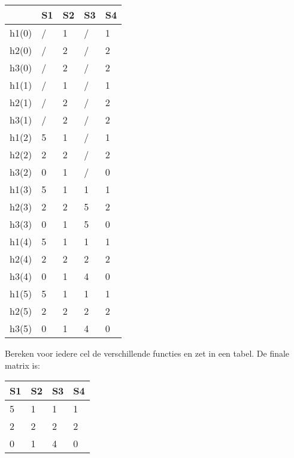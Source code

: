 \documentclass{exam}
\begin{document}
\begin{questions}
\begin{center}
    \begin{tabular}{| l | l | l | l | l |}
    \hline
	 & S1 & S2 & S3 & S4  \\ \hline
     h1(0) & / & 1 & / & 1\\ \hline
     h2(0) & / & 2 & / & 2\\ \hline
     h3(0) & / & 2 & / & 2\\ \hline\hline
     
      h1(1) & / & 1 & / & 1\\ \hline
     h2(1) & / & 2 & / & 2\\ \hline
     h3(1) & / & 2 & / & 2\\ \hline\hline
     
        h1(2) & 5 & 1 & / & 1\\ \hline
     h2(2) & 2 & 2 & / & 2\\ \hline
     h3(2) & 0 & 1 & / & 0\\ \hline\hline
     
      h1(3) & 5 & 1 & 1 & 1\\ \hline
     h2(3) & 2 & 2 & 5 & 2\\ \hline
     h3(3) & 0 & 1 & 5 & 0\\ \hline\hline
     
       h1(4) & 5 & 1 & 1 & 1\\ \hline
     h2(4) & 2 & 2 & 2 & 2\\ \hline
     h3(4) & 0 & 1 & 4 & 0\\ \hline\hline
     
       h1(5) & 5 & 1 & 1 & 1\\ \hline
     h2(5) & 2 & 2 & 2 & 2\\ \hline
     h3(5) & 0 & 1 & 4 & 0\\ \hline
    \end{tabular}
\end{center}

Bereken voor iedere cel de verschillende functies en zet in een tabel.
De finale matrix is: 

\begin{center}
    \begin{tabular}{| l | l | l | l |}
    \hline
	 S1 & S2 & S3 & S4  \\ \hline
     5 & 1 & 1 & 1 \\ \hline
     2 & 2 & 2 & 2 \\ \hline
     0 & 1 & 4 & 0 \\ \hline
    \end{tabular}
\end{center}


\end{questions}
\end{document}

